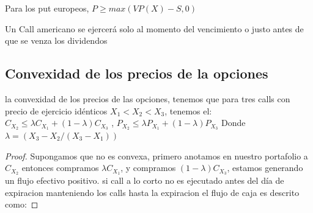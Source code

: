 \begin{defn}
\begin{lem}
								\end{lem}
									\begin{lem}\label{lmcp11}
									Para los put europeos, $ P\geq max(VP(X)-S,0) $ 	
									\end{lem}
									\begin{thm}
									Un Call americano se ejercerá solo al momento del vencimiento o justo antes de que se venza los dividendos
									
									\end{thm}
									\subsection	{Convexidad de los precios de la opciones }
										\begin{thm}
										 la convexidad de los precios de las opciones, tenemos que para tres calls con precio de ejercicio idénticos $ X_{1}<X_{2}<X_{3} $, tenemos el: 
											\newline
											$ C _{X_{2}} \leq \lambda C _{X_{1}} + (1-\lambda) C _{X_{3}} $ , $ P _{X_{2}} \leq \lambda P _{X_{1}} + (1-\lambda) P_{ X_{3}} $
											\newline
											Donde $ \lambda = (X_{3}-X_{2}/(X_{3}-X_{1})) $	
										\end{thm}
									\begin{proof} 
									Supongamos que no es convexa, primero anotamos en nuestro portafolio a $  C _{X_{2}}  $ entonces compramos $  \lambda C _{X_{1}}  $, y compramos $ (1- \lambda) C _{X_{3}}  $, estamos generando un flujo  efectivo positivo. si call a lo corto no es ejecutado antes del día de expiracion manteniendo los calls hasta la expiracion el flujo de caja es descrito como:\newpage
								

\end{proof}
\end{defn}
